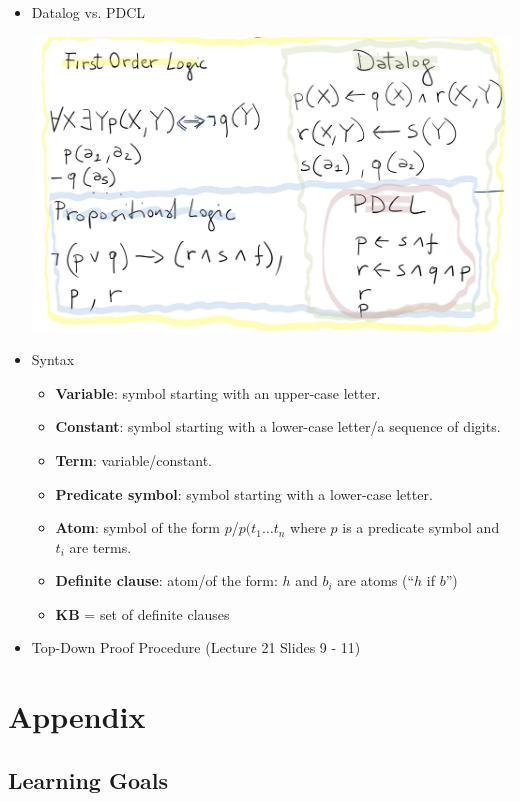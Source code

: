 \documentclass{article}
\begin{document}
\begin{itemize}
    \item Datalog vs. PDCL

    \includegraphics[scale=0.3]{datalog_vs_pdcl}
    \item Syntax
        \begin{itemize}
            \item \textbf{Variable}: symbol starting with an upper-case letter.
            \item \textbf{Constant}: symbol starting with a lower-case letter/a sequence of digits.
            \item \textbf{Term}: variable/constant.
            \item \textbf{Predicate symbol}: symbol starting with a lower-case letter.
            \item \textbf{Atom}: symbol of the form $p$/$p(t_1 \ldots t_n$ where $p$ is a predicate symbol and $t_i$ are terms.
            \item \textbf{Definite clause}: atom/of the form: $h$ and $b_i$ are atoms (``$h$ if $b$'')
            \item \textbf{KB} = set of definite clauses
        \end{itemize}
    \item Top-Down Proof Procedure (Lecture 21 Slides 9 - 11)
\end{itemize}

\section{Appendix}

\subsection{Learning Goals}
\end{document}
